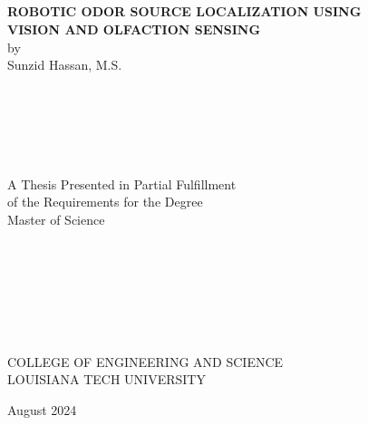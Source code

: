 \begin{center}\begin{singlespace}%
\ \\ %
\ \\ %
\ \\ %
\ \\ %
\end{singlespace}
{ \normalsize \textbf{
ROBOTIC ODOR SOURCE LOCALIZATION USING \\  %
 VISION AND OLFACTION SENSING}} \\
by\\
Sunzid Hassan, M.S.
\vfill
\begin{singlespace}%
\ \\
\ \\
\ \\
\ \\    %
\ \\    %
A Thesis Presented in Partial Fulfillment \\
of the Requirements for the Degree \\
Master of Science\\
\ \\
\ \\
\ \\
\ \\
\ \\
\ \\
\ \\
COLLEGE OF ENGINEERING AND SCIENCE\\
LOUISIANA TECH UNIVERSITY\\
\vfill

August 2024
\end{singlespace}
\end{center}



